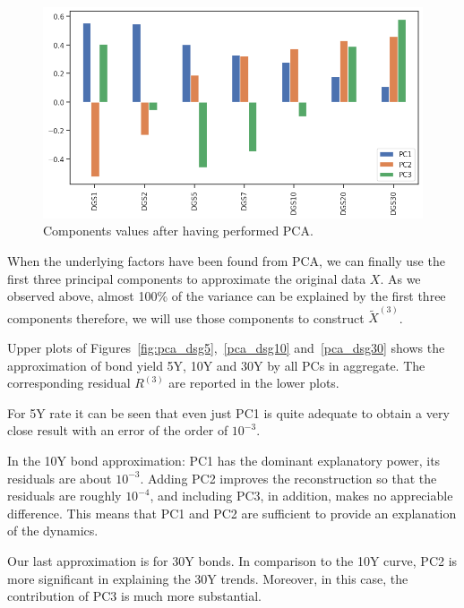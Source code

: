 \begin{enumerate}
\begin{figure}[hbtp]
	\centering
	\includegraphics[width=0.7\linewidth]{figures/yield_pca_components}
	\caption{Components values after having performed PCA.}
	\label{fig:yield_pca_components}
\end{figure}

When the underlying factors have been found from PCA, we can finally use the first three principal components to approximate the original data $X$. As we observed above, almost 100\% of the variance can be explained by the first three components therefore, we will use those components to construct $\tilde{X}^{(3)}$.

Upper plots of Figures~\ref{fig:pca_dsg5},~\ref{pca_dsg10} and~\ref{pca_dsg30} shows the approximation of bond yield 5Y, 10Y and 30Y by all PCs in aggregate.
The corresponding residual $R^{(3)}$ are reported in the lower plots.

For 5Y rate it can be seen that even just PC1 is quite adequate to obtain a very close result with an error of the order of $10^{-3}$.

In the 10Y bond approximation: PC1 has the dominant explanatory power, its residuals are about $10^{-3}$. Adding PC2 improves the reconstruction so that the residuals are roughly $10^{-4}$, and including PC3, in addition, makes no appreciable difference. This
means that PC1 and PC2 are sufficient to provide an explanation of the dynamics.

Our last approximation is for 30Y bonds. In comparison to the 10Y curve, PC2 is more significant in explaining the 30Y trends. Moreover, in this case, the contribution of PC3 is much more substantial.


\end{enumerate}

